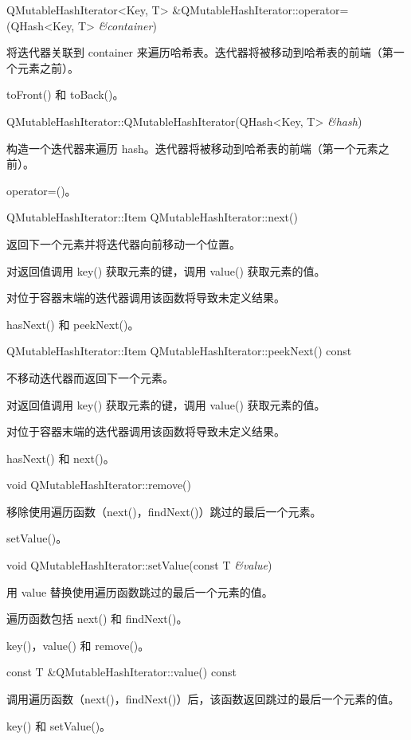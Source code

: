 QMutableHashIterator<Key, T> \&QMutableHashIterator::operator=(QHash<Key, T> \emph{\&container})

将迭代器关联到 container 来遍历哈希表。迭代器将被移动到哈希表的前端（第一个元素之前）。

\begin{seeAlso}
toFront() 和 toBack()。
\end{seeAlso}

QMutableHashIterator::QMutableHashIterator(QHash<Key, T> \emph{\&hash})

构造一个迭代器来遍历 hash。迭代器将被移动到哈希表的前端（第一个元素之前）。

\begin{seeAlso}
operator=()。
\end{seeAlso}

QMutableHashIterator::Item QMutableHashIterator::next()

返回下一个元素并将迭代器向前移动一个位置。

对返回值调用 key() 获取元素的键，调用 value() 获取元素的值。

对位于容器末端的迭代器调用该函数将导致未定义结果。

\begin{seeAlso}
hasNext() 和 peekNext()。
\end{seeAlso}

QMutableHashIterator::Item QMutableHashIterator::peekNext() const

不移动迭代器而返回下一个元素。

对返回值调用 key() 获取元素的键，调用 value() 获取元素的值。

对位于容器末端的迭代器调用该函数将导致未定义结果。

\begin{seeAlso}
hasNext() 和 next()。
\end{seeAlso}

void QMutableHashIterator::remove()

移除使用遍历函数（next()，findNext()）跳过的最后一个元素。

\begin{seeAlso}
setValue()。
\end{seeAlso}

void QMutableHashIterator::setValue(const T \emph{\&value})


用 value 替换使用遍历函数跳过的最后一个元素的值。

遍历函数包括 next() 和 findNext()。

\begin{seeAlso}
key()，value() 和 remove()。
\end{seeAlso}

const T \&QMutableHashIterator::value() const

调用遍历函数（next()，findNext()）后，该函数返回跳过的最后一个元素的值。

\begin{seeAlso}
key() 和 setValue()。
\end{seeAlso}